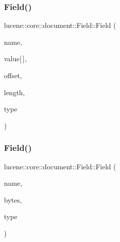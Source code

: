 \subsubsection{\texorpdfstring{Field()}{Field()}\hspace{0.1cm}{\footnotesize\ttfamily [5/11]}}
{\footnotesize\ttfamily lucene\+::core\+::document\+::\+Field\+::\+Field (\begin{DoxyParamCaption}\item[{const std\+::string \&}]{name,  }\item[{const char}]{value\mbox{[}$\,$\mbox{]},  }\item[{const uint32\+\_\+t}]{offset,  }\item[{const uint32\+\_\+t}]{length,  }\item[{const \mbox{\hyperlink{classlucene_1_1core_1_1document_1_1FieldType}{Field\+Type}} \&}]{type }\end{DoxyParamCaption})\hspace{0.3cm}{\ttfamily [inline]}}

\mbox{\label{classlucene_1_1core_1_1document_1_1Field_aa5b5549c89b6da80093ffa9ba4f218f8}} 
\subsubsection{\texorpdfstring{Field()}{Field()}\hspace{0.1cm}{\footnotesize\ttfamily [6/11]}}
{\footnotesize\ttfamily lucene\+::core\+::document\+::\+Field\+::\+Field (\begin{DoxyParamCaption}\item[{const std\+::string \&}]{name,  }\item[{const \mbox{\hyperlink{classlucene_1_1core_1_1util_1_1BytesRef}{lucene\+::core\+::util\+::\+Bytes\+Ref}} \&}]{bytes,  }\item[{const \mbox{\hyperlink{classlucene_1_1core_1_1document_1_1FieldType}{Field\+Type}} \&}]{type }\end{DoxyParamCaption})\hspace{0.3cm}{\ttfamily [inline]}}

\mbox{\label{classlucene_1_1core_1_1document_1_1Field_a53623937bdf694c7d4e359842b9c7673}} 
